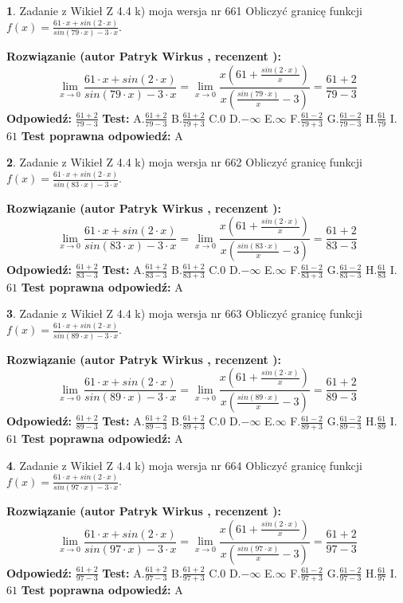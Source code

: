 \documentclass[12pt, a4paper]{article}
\theoremstyle{definition} %
\newtheorem{zad}{}
\newcommand{\zadStart}[1]{\begin{zad}#1\newline}
\newcommand{\zadStop}{\end{zad}}
\newcommand{\rozwStart}[2]{\noindent \textbf{Rozwiązanie (autor #1 , recenzent #2): }\newline}
\newcommand{\rozwStop}{\newline}
\newcommand{\odpStart}{\noindent \textbf{Odpowiedź:}\newline}
\newcommand{\odpStop}{\newline}
\newcommand{\testStart}{\noindent \textbf{Test:}\newline}
\newcommand{\testStop}{\newline}
\newcommand{\kluczStart}{\noindent \textbf{Test poprawna odpowiedź:}\newline}
\newcommand{\kluczStop}{\newline}
\begin{document}
\zadStart{Zadanie z Wikieł Z 4.4 k) moja wersja nr 661}
Obliczyć granicę funkcji $f(x)=\frac{61\cdot x +sin(2\cdot x)}{sin(79\cdot x) -3\cdot x}$.
\zadStop
\rozwStart{Patryk Wirkus}{}
$$\lim\limits_{x\to 0}\frac{61\cdot x +sin(2\cdot x)}{sin(79\cdot x) -3\cdot x}
=\lim\limits_{x\to 0}\frac{x(61+\frac{sin(2\cdot x)}{x})}{x(\frac{sin(79\cdot x)}{x}-3)}
=\frac{61+2}{79-3}$$
\rozwStop
\odpStart
$\frac{61+2}{79-3}$
\odpStop
\testStart
A.$\frac{61+2}{79-3}$
B.$\frac{61+2}{79+3}$
C.$0$
D.$-\infty$
E.$\infty$
F.$\frac{61-2}{79+3}$
G.$\frac{61-2}{79-3}$
H.$\frac{61}{79}$
I.$61$
\testStop
\kluczStart
A
\kluczStop



\zadStart{Zadanie z Wikieł Z 4.4 k) moja wersja nr 662}
Obliczyć granicę funkcji $f(x)=\frac{61\cdot x +sin(2\cdot x)}{sin(83\cdot x) -3\cdot x}$.
\zadStop
\rozwStart{Patryk Wirkus}{}
$$\lim\limits_{x\to 0}\frac{61\cdot x +sin(2\cdot x)}{sin(83\cdot x) -3\cdot x}
=\lim\limits_{x\to 0}\frac{x(61+\frac{sin(2\cdot x)}{x})}{x(\frac{sin(83\cdot x)}{x}-3)}
=\frac{61+2}{83-3}$$
\rozwStop
\odpStart
$\frac{61+2}{83-3}$
\odpStop
\testStart
A.$\frac{61+2}{83-3}$
B.$\frac{61+2}{83+3}$
C.$0$
D.$-\infty$
E.$\infty$
F.$\frac{61-2}{83+3}$
G.$\frac{61-2}{83-3}$
H.$\frac{61}{83}$
I.$61$
\testStop
\kluczStart
A
\kluczStop



\zadStart{Zadanie z Wikieł Z 4.4 k) moja wersja nr 663}
Obliczyć granicę funkcji $f(x)=\frac{61\cdot x +sin(2\cdot x)}{sin(89\cdot x) -3\cdot x}$.
\zadStop
\rozwStart{Patryk Wirkus}{}
$$\lim\limits_{x\to 0}\frac{61\cdot x +sin(2\cdot x)}{sin(89\cdot x) -3\cdot x}
=\lim\limits_{x\to 0}\frac{x(61+\frac{sin(2\cdot x)}{x})}{x(\frac{sin(89\cdot x)}{x}-3)}
=\frac{61+2}{89-3}$$
\rozwStop
\odpStart
$\frac{61+2}{89-3}$
\odpStop
\testStart
A.$\frac{61+2}{89-3}$
B.$\frac{61+2}{89+3}$
C.$0$
D.$-\infty$
E.$\infty$
F.$\frac{61-2}{89+3}$
G.$\frac{61-2}{89-3}$
H.$\frac{61}{89}$
I.$61$
\testStop
\kluczStart
A
\kluczStop



\zadStart{Zadanie z Wikieł Z 4.4 k) moja wersja nr 664}
Obliczyć granicę funkcji $f(x)=\frac{61\cdot x +sin(2\cdot x)}{sin(97\cdot x) -3\cdot x}$.
\zadStop
\rozwStart{Patryk Wirkus}{}
$$\lim\limits_{x\to 0}\frac{61\cdot x +sin(2\cdot x)}{sin(97\cdot x) -3\cdot x}
=\lim\limits_{x\to 0}\frac{x(61+\frac{sin(2\cdot x)}{x})}{x(\frac{sin(97\cdot x)}{x}-3)}
=\frac{61+2}{97-3}$$
\rozwStop
\odpStart
$\frac{61+2}{97-3}$
\odpStop
\testStart
A.$\frac{61+2}{97-3}$
B.$\frac{61+2}{97+3}$
C.$0$
D.$-\infty$
E.$\infty$
F.$\frac{61-2}{97+3}$
G.$\frac{61-2}{97-3}$
H.$\frac{61}{97}$
I.$61$
\testStop
\kluczStart
A
\kluczStop
\end{document}
